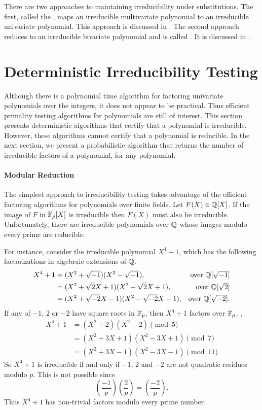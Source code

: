 There are two approaches to maintaining irreducibility under
substitutions.  The first, called the , maps an irreducible multivariate polynomial to an
irreducible univariate polynomial.  This approach is discussed in
.  The second approach reduces to an irreducible
bivariate polynomial and is called .  It is
discussed in .

\section{Deterministic Irreducibility Testing}
\label{Irred:Test:Sec}

Although there is a polynomial time algorithm for factoring univariate
polynomials over the integers, it does not appear to be practical.
Thus efficient primality testing algorithms for polynomials are still
of interest.  This section presents  deterministic algorithms that
certify that a polynomial is irreducible.  However, these algorithms
cannot certify that  a polynomial is reducible.  In the next section,
we present a probabilistic algorithm that returns the number of
irreducible factors of a polynomial, for any polynomial. 

\paragraph{Modular Reduction}

The simplest approach to irreducibility testing takes advantage of the 
efficient factoring algorithms for polynomials over finite fields.  Let
$F(X) \in \mathbb{Q}[X]$.  If the image of $F$ in $\mathbb{F}_p[X]$ is irreducible
then $F(X)$ must also be irreducible.  Unfortunately, there are
irreducible polynomials over $\mathbb{Q}$ whose images modulo every prime are
reducible.  

For instance, consider the irreducible polynomial $X^4+1$, which has
the following factorizations in algebraic extensions of $\mathbb{Q}$.
\[
\begin{aligned}
X^4 + 1 &= (X^2 + \sqrt{-1})(X^2 - \sqrt{-1}), 
   &\mbox{over $\mathbb{Q}[\sqrt{-1}]$}\\
&= (X^2 + \sqrt{2} X + 1) (X^2 - \sqrt{2} X + 1), 
   & \mbox{over $\mathbb{Q}[\sqrt{2}]$}\\
&= (X^2 + \sqrt{-2} X - 1) (X^2 - \sqrt{-2} X - 1), 
   & \mbox{over $\mathbb{Q}[\sqrt{-2}]$.}\\
\end{aligned}
\]
If any of $-1$, $2$ or $-2$ have square roots in $\mathbb{F}_p$, then $X^4+1$
factors over $\mathbb{F}_p$, \eg,
\[
\begin{aligned}
X^4 +1 & = (X^2 + 2) (X^2 - 2) \pmod{5}\\
 & = (X^2 + 3X + 1) (X^2 - 3X + 1) \pmod{7}\\
 & = (X^2 + 3X - 1) (X^2 - 3X - 1) \pmod{11}
\end{aligned}
\]
So $X^4+1$ is irreducible if and only if $-1$, $2$ and $-2$ are not
quadratic residues modulo $p$.  This is not possible since
\[
\left(\frac{-1}{p}\right) \left(\frac{2}{p}\right) =
\left(\frac{-2}{p}\right).
\]
Thus $X^4+1$ has non-trivial factors modulo every prime number. 

